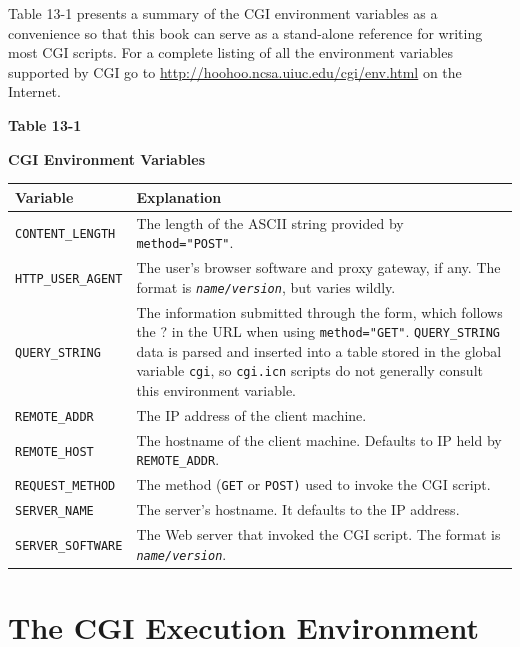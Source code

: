{

Table 13-1 presents a summary of the CGI environment variables as a
convenience so that this book can serve as a stand-alone reference for
writing most CGI scripts. For a complete listing of all the environment
variables supported by CGI go to
\url{http://hoohoo.ncsa.uiuc.edu/cgi/env.html} on the Internet.

{\centering\sffamily\bfseries Table 13-1}

{\centering\sffamily\bfseries CGI Environment Variables}

\begin{flushleft}
\tablehead{}
\begin{supertabular}{|m{1.65in}|m{4.15in}|}
\hline
\sffamily\bfseries Variable &
\sffamily\bfseries Explanation\\\hline
\texttt{CONTENT\_LENGTH} &
The length of the ASCII string provided by
\texttt{method="POST"}.\\\hline
\texttt{HTTP\_USER\_AGENT} &
The user's browser software and proxy gateway, if any.
The format is \texttt{\textit{name/version}}, but varies
wildly.\\\hline
\texttt{QUERY\_STRING} &
The information submitted through the form, which follows the ? in the
URL when using \texttt{method="GET"}.
\texttt{QUERY\_STRING} data is parsed and inserted into a table
stored in the global variable \texttt{cgi}, so
\texttt{cgi.icn} scripts do not generally consult this environment
variable.\\\hline
\texttt{REMOTE\_ADDR} &
The IP address of the client machine.\\\hline
\texttt{REMOTE\_HOST} &
The hostname of the client machine. Defaults to IP held by
\texttt{REMOTE\_ADDR}.\\\hline
\texttt{REQUEST\_METHOD} &
The method (\texttt{GET} or \texttt{POST)} used to invoke the CGI
script.\\\hline
\texttt{SERVER\_NAME} &
The server's hostname. It defaults to the IP
address.\\\hline
\texttt{SERVER\_SOFTWARE} &
The Web server that invoked the CGI script. The format is
\texttt{\textit{name/version}}.\\\hline
\end{supertabular}
\end{flushleft}

\section{The CGI Execution Environment}

}
